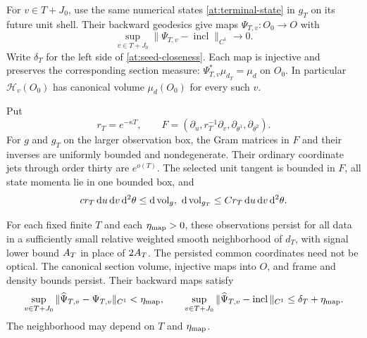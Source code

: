 \begin{proposition}
\label{prop:matched-seeds}
For $v\in T+J_0$, use the same numerical states \eqref{at:terminal-state} in
$g_T$ on its future unit shell. Their backward geodesics give
maps $\Psi_{T,v}:O_0\to O$ with
\begin{equation}\label{at:seed-closeness}
 \sup_{v\in T+J_0}\|\Psi_{T,v}-\operatorname{incl}\|_{C^1}
                                  \longrightarrow0.
\end{equation}
Write $\delta_T$ for the left side of \eqref{at:seed-closeness}.
Each map is injective and preserves the corresponding section
measure: $\Psi_{T,v}^*\mu_{d_T}=\mu_d$ on $O_0$. In particular
$\mathcal H_v(O_0)$ has canonical volume $\mu_d(O_0)$ for every such $v$.

Put
\begin{equation}\label{at:frame}
 r_T=e^{-\kappa T},\qquad
 F=(\partial_u,r_T^{-1}\partial_v,
                    \partial_{\theta^1},\partial_{\theta^2}).
\end{equation}
For $g$ and $g_T$ on the larger observation box, the Gram
matrices in $F$ and their inverses are uniformly bounded and
nondegenerate. Their ordinary coordinate jets through order
thirty are $e^{o(T)}$. The selected unit tangent is bounded
in $F$, all state momenta lie in one bounded box, and
\begin{equation}\label{at:volume}
 c r_T\,\mathrm d u\,\mathrm d v\,\mathrm d^2\theta
 \le \mathrm d\operatorname{vol}_g,\ \mathrm d\operatorname{vol}_{g_T}
 \le C r_T\,\mathrm d u\,\mathrm d v\,\mathrm d^2\theta.
\end{equation}

For each fixed finite $T$ and each $\eta_{\rm map}>0$, these observations
persist for all data in a sufficiently small relative weighted smooth
neighborhood of $d_T$, with signal lower bound $A_T$ in place of
$2A_T$. The persisted common coordinates need not be optical.
The canonical section volume, injective maps into $O$, and frame
and density bounds persist. Their backward maps satisfy
\[
 \sup_{v\in T+J_0}\|\widehat\Psi_{T,v}-\Psi_{T,v}\|_{C^1}
 <\eta_{\rm map},
 \qquad
 \sup_{v\in T+J_0}\|\widehat\Psi_{T,v}-\operatorname{incl}\|_{C^1}
 \le\delta_T+\eta_{\rm map}.
\]
The neighborhood may depend on $T$ and $\eta_{\rm map}$.
\end{proposition}

